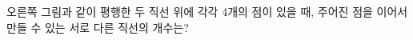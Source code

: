 \noindent\begin{minipage}[t]{0.58\linewidth}\vspace{0pt}\raggedright 오른쪽 그림과 같이 평행한 두 직선 위에 각각 4개의 점이 있을 때, 주어진 점을 이어서 만들 수 있는 서로 다른 직선의 개수는?\end{minipage}\hfill\begin{minipage}[t]{0.4\linewidth}\vspace{0pt}\centering \resizebox{\ifdim\width>\linewidth\linewidth\else\width\fi}{!}{}\end{minipage}\par
{}

